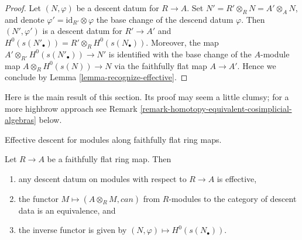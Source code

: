 \begin{proof}
Let $(N, \varphi)$ be a descent datum for $R \to A$.
Set $N' = R' \otimes_R N = A' \otimes_A N$, and denote
$\varphi' = \text{id}_{R'} \otimes \varphi$ the base change
of the descend datum $\varphi$. Then $(N', \varphi')$ is
a descent datum for $R' \to A'$ and
$H^0(s(N'_\bullet)) = R' \otimes_R H^0(s(N_\bullet))$.
Moreover, the map
$A' \otimes_{R'} H^0(s(N'_\bullet)) \to N'$ is identified
with the base change of the $A$-module map
$A \otimes_R H^0(s(N)) \to N$ via the faithfully flat map
$A \to A'$. Hence we conclude by Lemma \ref{lemma-recognize-effective}.
\end{proof}

\noindent
Here is the main result of this section.
Its proof may seem a little clumsy; for a more highbrow approach see
Remark \ref{remark-homotopy-equivalent-cosimplicial-algebras} below.

\begin{proposition}
\label{proposition-descent-module}
\begin{slogan}
Effective descent for modules along faithfully flat ring maps.
\end{slogan}
Let $R \to A$ be a faithfully flat ring map.
Then
\begin{enumerate}
\item any descent datum on modules with respect to $R \to A$
is effective,
\item the functor $M \mapsto (A \otimes_R M, can)$ from $R$-modules
to the category of descent data is an equivalence, and
\item the inverse functor is given by $(N, \varphi) \mapsto H^0(s(N_\bullet))$.
\end{enumerate}
\end{proposition}

